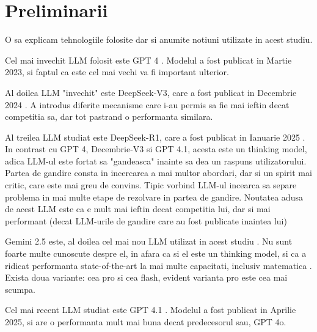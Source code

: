 \chapter{Preliminarii}

O sa explicam tehnologiile folosite dar si anumite notiuni utilizate in acest studiu.

Cel mai invechit LLM folosit este GPT 4 \cite{gpt4}. Modelul a fost publicat in Martie 2023, si faptul ca este cel mai vechi va fi important ulterior.

Al doilea LLM "invechit" este DeepSeek-V3, care a fost publicat in Decembrie 2024 \cite{v3}. A introdus diferite mecanisme care i-au permis sa fie mai ieftin decat 
competitia sa, dar tot pastrand o performanta similara.

Al treilea LLM studiat este DeepSeek-R1, care a fost publicat in Ianuarie 2025 \cite{r1} . In contrast cu GPT 4, Decembrie-V3 si GPT 4.1, acesta este un thinking model, 
adica LLM-ul este fortat sa "gandeasca" inainte sa dea un raspuns utilizatorului. Partea de gandire consta in incercarea a mai multor abordari, dar si
un spirit mai critic, care este mai greu de convins. Tipic vorbind LLM-ul incearca sa separe problema in mai multe etape de rezolvare in partea de gandire.
Noutatea adusa de acest LLM este ca e mult mai ieftin decat competitia lui, dar si mai performant (decat LLM-urile de gandire care au fost publicate inaintea lui)

Gemini 2.5 este, al doilea cel mai nou LLM utilizat in acest studiu \cite{gemini} . Nu sunt foarte multe cunoscute despre el, in afara ca si el este 
un thinking model, si ca a ridicat performanta state-of-the-art la mai multe capacitati, inclusiv matematica \cite{gemini}. Exista doua variante: cea pro si cea flash, 
evident varianta pro este cea mai scumpa.

Cel mai recent LLM studiat este GPT 4.1 \cite{gpt41}. Modelul a fost publicat in Aprilie 2025, si are o performanta mult mai buna decat predecesorul sau, GPT 4o.

